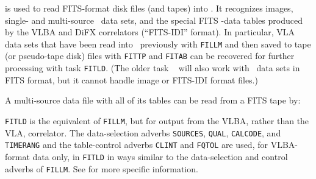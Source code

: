      {\tt {}} is used to read FITS-format disk files (and
tapes) into \hbox{\AIPS}. It recognizes images, single- and
multi-source \uv\ data sets, and the special FITS \uv-data tables
produced by the VLBA and DiFX correlators (``FITS-IDI'' format).  In
particular, VLA data sets that have been read into \AIPS\ previously
with {\tt FILLM} and then saved to tape (or pseudo-tape disk) files
with {\tt FITTP} and {\tt FITAB} can be recovered for further
processing with task \hbox{{\tt FITLD}}.  (The older task {\tt
{}} will also work with \uv\ data sets in FITS format, but
it cannot handle image or FITS-IDI format files.)

     A multi-source data file with all of its tables can be read from
a FITS tape by:

     {\tt FITLD} is the equivalent of {\tt FILLM}, but for output from
the VLBA, rather than the VLA, correlator.  The data-selection adverbs
{\tt SOURCES}, {\tt QUAL}, {\tt CALCODE}, and {\tt TIMERANG} and the
table-control adverbs {\tt CLINT} and {\tt FQTOL} are used, for
VLBA-format data only, in {\tt FITLD} in ways similar to the
data-selection and control adverbs of \hbox{{\tt FILLM}}.  See
 for more specific information.



